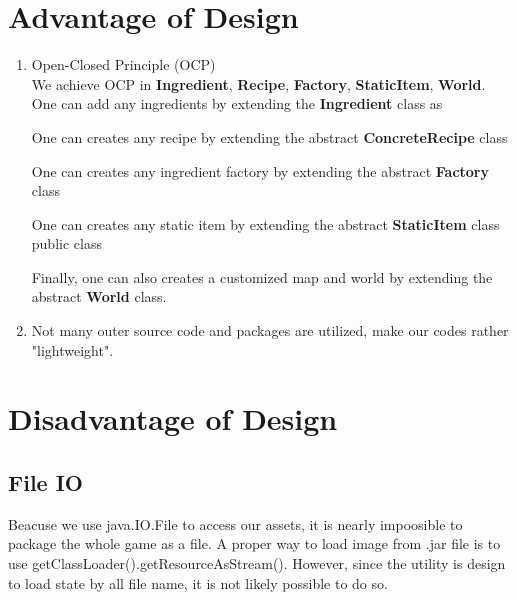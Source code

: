 



\newpage
\section{Advantage of Design}
\begin{enumerate}
\item Open-Closed Principle (OCP) \\
We achieve OCP in \textbf{Ingredient}, \textbf{Recipe}, \textbf{Factory}, \textbf{StaticItem}, \textbf{World}.
    One can add any ingredients by extending the \textbf{Ingredient} class as


One can creates any recipe by extending the abstract \textbf{ConcreteRecipe} class


One can creates any ingredient factory by extending the abstract \textbf{Factory} class


One can creates any static item by extending the abstract \textbf{StaticItem} class public class


Finally, one can also creates a customized map and world by extending the abstract \textbf{World} class.
\item Not many outer source code and packages are utilized, make our codes rather "lightweight".
\end{enumerate}

\section{Disadvantage of Design}
\subsection{File IO}
Beacuse we use java.IO.File to access our assets, it is nearly impoosible to package the whole game as a file.
A proper way to load image from .jar file is to use getClassLoader().getResourceAsStream(). However, since the utility is design to load state by
all file name, it is not likely possible to do so.
